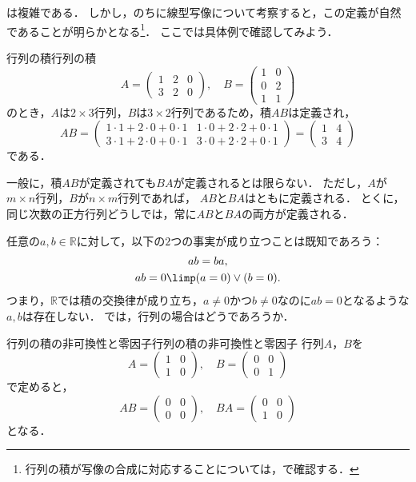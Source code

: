 は複雑である．
しかし，のちに線型写像について考察すると，この定義が自然であることが明らかとなる\footnote{行列の積が写像の合成に対応することについては，で確認する．}．
ここでは具体例で確認してみよう．

\begin{example}{行列の積}{行列の積}
  \[
    A = \begin{pmatrix} 1 & 2 & 0 \\ 3 & 2 & 0 \end{pmatrix}, \quad
    B = \begin{pmatrix} 1 & 0 \\ 0 & 2 \\ 1 & 1 \end{pmatrix}
  \]
  のとき，$A$は$2 \times 3$行列，$B$は$3 \times 2$行列であるため，積$AB$は定義され，
  \[
    AB =
    \begin{pmatrix}
      1 \cdot 1 + 2 \cdot 0 + 0 \cdot 1 & 1 \cdot 0 + 2 \cdot 2 + 0 \cdot 1 \\
      3 \cdot 1 + 2 \cdot 0 + 0 \cdot 1 & 3 \cdot 0 + 2 \cdot 2 + 0 \cdot 1
    \end{pmatrix}
    =
    \begin{pmatrix}
      1 & 4 \\
      3 & 4
    \end{pmatrix}
  \]
  である．
\end{example}

一般に，積$AB$が定義されても$BA$が定義されるとは限らない．
ただし，$A$が$m\times n$行列，$B$が$n\times m$行列であれば，
$AB$と$BA$はともに定義される．
とくに，同じ次数の正方行列どうしでは，常に$AB$と$BA$の両方が定義される．

任意の$a, b \in \mathbb{R}$に対して，以下の$2$つの事実が成り立つことは既知であろう：
\begin{gather*}
  ab = ba, \\
  ab = 0 \limp (a = 0) \lor (b = 0).
\end{gather*}
つまり，$\mathbb{R}$では積の交換律が成り立ち，$a \ne 0$かつ$b \ne 0$なのに$ab = 0$となるような$a, b$は存在しない．
では，行列の場合はどうであろうか．

\begin{example}{行列の積の非可換性と零因子}{行列の積の非可換性と零因子}
  行列$A$，$B$を
  \[
    A = \begin{pmatrix} 1 & 0 \\ 1 & 0 \end{pmatrix}, \quad
    B = \begin{pmatrix} 0 & 0 \\ 0 & 1 \end{pmatrix}
  \]
  で定めると，
  \[
    AB = \begin{pmatrix} 0 & 0 \\ 0 & 0 \end{pmatrix}, \quad
    BA = \begin{pmatrix} 0 & 0 \\ 1 & 0 \end{pmatrix}
  \]
  となる．
\end{example}

